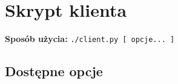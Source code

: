 


\subtitle{Dokumentacja użytkownika}
\maketitle

\tableofcontents
\vfill
\pagebreak

\section{Skrypt klienta}

  \textbf{Sposób użycia:}
  \texttt{./client.py [ opcje... ]}

  \subsection{Dostępne opcje}

